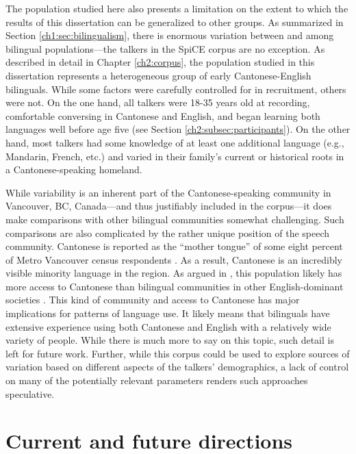 The population studied here also presents a limitation on the extent to which the results of this dissertation can be generalized to other groups. As summarized in Section \ref{ch1:sec:bilingualism}, there is enormous variation between and among bilingual populations---the talkers in the SpiCE corpus are no exception. As described in detail in Chapter \ref{ch2:corpus}, the population studied in this dissertation represents a heterogeneous group of early Cantonese-English bilinguals. While some factors were carefully controlled for in recruitment, others were not. On the one hand, all talkers were 18-35 years old at recording, comfortable conversing in Cantonese and English, and began learning both languages well before age five (see Section \ref{ch2:subsec:participants}). On the other hand, most talkers had some knowledge of at least one additional language (e.g., Mandarin, French, etc.) and varied in their family's current or historical roots in a Cantonese-speaking homeland. 

While variability is an inherent part of the Cantonese-speaking community in Vancouver, BC, Canada---and thus justifiably included in the corpus---it does make comparisons with other bilingual communities somewhat challenging. Such comparisons are also complicated by the rather unique position of the speech community. Cantonese is reported as the ``mother tongue'' of some eight percent of Metro Vancouver census respondents \citep{statistics_2017_proportion}. As a result, Cantonese is an incredibly visible minority language in the region. As argued in \citet{chan_2020_lexically}, this population likely has more access to Cantonese than bilingual communities in other English-dominant societies \citep[e.g.,][]{bruggeman_2019_l1}. This kind of community and access to Cantonese has major implications for patterns of language use. It likely means that bilinguals have extensive experience using both Cantonese and English with a relatively wide variety of people. While there is much more to say on this topic, such detail is left for future work. Further, while this corpus could be used to explore sources of variation based on different aspects of the talkers' demographics, a lack of control on many of the potentially relevant parameters renders such approaches speculative. 

\section{Current and future directions}\label{ch5:sec:directions}

